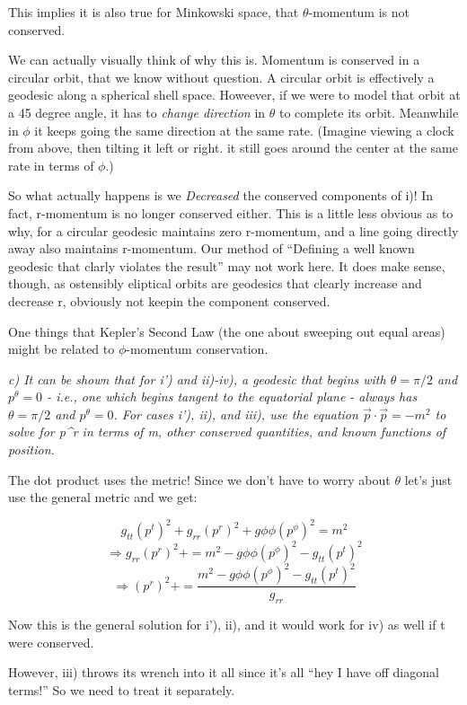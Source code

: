 \documentclass[landscape,letterpaper,10pt,english]{article}
\begin{document}
This implies it is also true for Minkowski space, that
\(\theta\)-momentum is not conserved.

We can actually visually think of why this is. Momentum is conserved in
a circular orbit, that we know without question. A circular orbit is
effectively a geodesic along a spherical shell space. Howeever, if we
were to model that orbit at a 45 degree angle, it has to \emph{change
direction} in \(\theta\) to complete its orbit. Meanwhile in \(\phi\) it
keeps going the same direction at the same rate. (Imagine viewing a
clock from above, then tilting it left or right. it still goes around
the center at the same rate in terms of \(\phi\).)

So what actually happens is we \emph{Decreased} the conserved components
of i)! In fact, r-momentum is no longer conserved either. This is a
little less obvious as to why, for a circular geodesic maintains zero
r-momentum, and a line going directly away also maintains r-momentum.
Our method of ``Defining a well known geodesic that clarly violates the
result'' may not work here. It does make sense, though, as ostensibly
eliptical orbits are geodesics that clearly increase and decrease r,
obviously not keepin the component conserved.

One things that Kepler's Second Law (the one about sweeping out equal
areas) might be related to \(\phi\)-momentum conservation.

    \emph{c) It can be shown that for i') and ii)-iv), a geodesic that
begins with \(\theta = \pi/2\) and \(p^\theta = 0\) - i.e., one which
begins tangent to the equatorial plane - always has \(\theta = \pi/2\)
and \(p^\theta = 0\). For cases i'), ii), and iii), use the equation
\(\vec p \cdot \vec p = -m^2\) to solve for p\^{}r in terms of m, other
conserved quantities, and known functions of position.}

    The dot product uses the metric! Since we don't have to worry about
\(\theta\) let's just use the general metric and we get:

\[g_{tt} (p^t)^2 + g_{rr} (p^r)^2 + g{\phi\phi} (p^\phi)^2 = m^2\]
\[\Rightarrow g_{rr} (p^r)^2 +  = m^2 - g{\phi\phi} (p^\phi)^2 - g_{tt} (p^t)^2 \]
\[\Rightarrow (p^r)^2 +  = \frac{m^2 - g{\phi\phi} (p^\phi)^2 - g_{tt} (p^t)^2}{g_{rr}} \]

Now this is the general solution for i'), ii), and it would work for iv)
as well if t were conserved.

However, iii) throws its wrench into it all since it's all ``hey I have
off diagonal terms!'' So we need to treat it separately.
\end{document}
